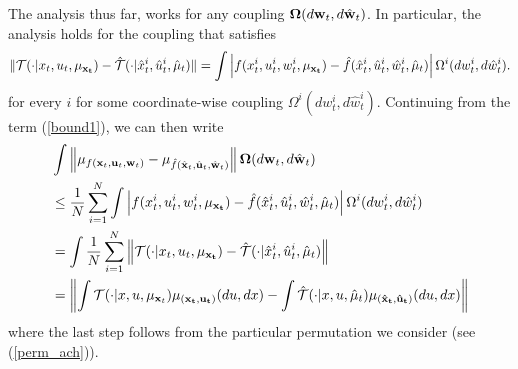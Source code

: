 \documentclass[twoside,11pt]{article}
\begin{document}
The analysis thus far, works for any coupling  ${\bf \Omega}(d{\bf w}_t, d\hat{\bf w}_t)$. In particular, the analysis holds for the coupling that satisfies
\begin{align*}
\| \mathcal{T}(\cdot|x_t,u_t,\mu_{\bf x_t}) - \hat{\mathcal{T}}(\cdot|\hat{x}^i_t,\hat{u}^i_t,\hat{\mu}_t)\| =  \int  \left| f(x^i_t,u^i_t,w_t^i, \mu_{\bf x_t}) - \hat{f}(\hat{x}_t^i,\hat{u}_t^i,\hat{w}_t^i,\hat{\mu}_t) \right|  { \Omega^i}(dw^i_t, d\hat{w}^i_t).
\end{align*}
for every $i$ for some coordinate-wise coupling $\Omega^i(dw_t^i,d\hat{w}_t^i)$. Continuing from the term (\ref{bound1}), we can then write 
\begin{align*}
 & \int  \left\|\mu_{ f({\bf x}_t,{\bf u}_t,{\bf w}_t)} - {\mu}_{\hat{f}(\hat{\bf x}_t, \hat{\bf u}_t , \hat{\bf w}_t) }\right\| {\bf \Omega}(d{\bf w}_t, d\hat{\bf w}_t) \nonumber\\
&\leq \frac{1}{N}\sum_{i=1}^N \int  \left| f(x^i_t,u^i_t,w_t^i, \mu_{\bf x_t}) - \hat{f}(\hat{x}_t^i,\hat{u}_t^i,\hat{w}_t^i,\hat{\mu}_t) \right|  { \Omega^i}(dw^i_t, d\hat{w}^i_t)\\
& = \int \frac{1}{N}\sum_{i=1}^N \left\|  \mathcal{T}(\cdot|x_t,u_t,\mu_{\bf x_t}) - \hat{\mathcal{T}}(\cdot|\hat{x}^i_t,\hat{u}^i_t,\hat{\mu}_t)\right\|\\
&=\left\| \int  \mathcal{T}(\cdot|x,u,\mu_{{\bf x}_t}) \mu_{\bf (x_t,u_t)}(du,dx) - \int\hat{\mathcal{T}}(\cdot|x,u,\hat{\mu}_t) \mu_{(\bf \hat{x}_t , \hat{u}_t)}(du,dx)\right\|
\end{align*}
where the last step follows from the particular permutation we consider (see (\ref{perm_ach})).
\end{document}
